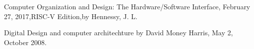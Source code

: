 

\newpage
 \begin{thebibliography}{9}
	
	 Computer Organization and Design: The Hardware/Software Interface, February 27, 2017,RISC-V Edition,by Hennessy, J. L.  
  
	Digital Design and computer architechture by David Money Harris, May 2, October 2008. 
	
	
\end{thebibliography}